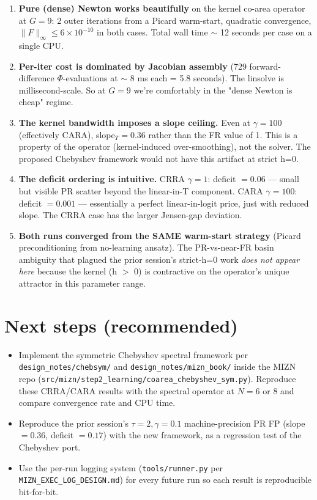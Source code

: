 \documentclass[11pt]{article}
\begin{document}
\begin{enumerate}
\item \textbf{Pure (dense) Newton works beautifully} on the kernel co-area
operator at $G=9$: 2 outer iterations from a Picard warm-start, quadratic
convergence, $\|F\|_\infty \le 6 \times 10^{-10}$ in both cases. Total wall
time $\sim$ 12 seconds per case on a single CPU.

\item \textbf{Per-iter cost is dominated by Jacobian assembly} (729
forward-difference $\Phi$-evaluations at $\sim$ 8 ms each = 5.8 seconds).
The linsolve is millisecond-scale. So at $G=9$ we're comfortably in the
"dense Newton is cheap" regime.

\item \textbf{The kernel bandwidth imposes a slope ceiling.} Even at $\gamma
= 100$ (effectively CARA), slope$_T = 0.36$ rather than the FR value of 1.
This is a property of the operator (kernel-induced over-smoothing), not the
solver. The proposed Chebyshev framework would not have this artifact at
strict h=0.

\item \textbf{The deficit ordering is intuitive.} CRRA $\gamma = 1$:
deficit $= 0.06$ --- small but visible PR scatter beyond the linear-in-T
component. CARA $\gamma = 100$: deficit $= 0.001$ --- essentially a perfect
linear-in-logit price, just with reduced slope. The CRRA case has the
larger Jensen-gap deviation.

\item \textbf{Both runs converged from the SAME warm-start strategy}
(Picard preconditioning from no-learning ansatz). The PR-vs-near-FR basin
ambiguity that plagued the prior session's strict-h=0 work \emph{does not
appear here} because the kernel (h $>$ 0) is contractive on the operator's
unique attractor in this parameter range.
\end{enumerate}

\section{Next steps (recommended)}

\begin{itemize}
\item Implement the symmetric Chebyshev spectral framework per
\texttt{design\_notes/chebsym/} and \texttt{design\_notes/mizn\_book/}
inside the MIZN repo (\texttt{src/mizn/step2\_learning/coarea\_chebyshev\_sym.py}).
Reproduce these CRRA/CARA results with the spectral operator at $N = 6$
or $8$ and compare convergence rate and CPU time.
\item Reproduce the prior session's $\tau = 2, \gamma = 0.1$ machine-precision
PR FP (slope $= 0.36$, deficit $= 0.17$) with the new framework, as a
regression test of the Chebyshev port.
\item Use the per-run logging system (\texttt{tools/runner.py} per
\texttt{MIZN\_EXEC\_LOG\_DESIGN.md}) for every future run so each result
is reproducible bit-for-bit.
\end{itemize}
\end{document}
